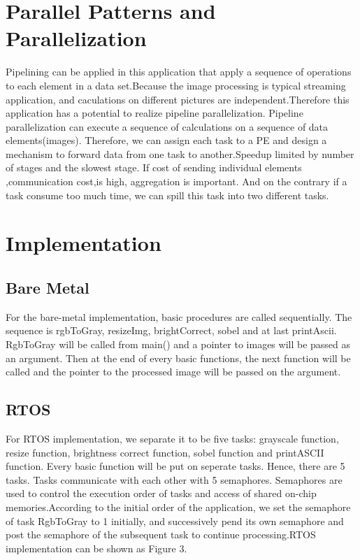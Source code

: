 \documentclass[conference,compsoc]{IEEEtran}
\begin{document}
\section{Parallel Patterns and Parallelization}
Pipelining can be applied in this application that apply a sequence of operations to
each element in a data set.Because the image processing is typical streaming application, and caculations on different pictures are independent.Therefore this application has a potential to realize pipeline parallelization. Pipeline parallelization can execute a sequence of calculations on a sequence of data elements(images). Therefore, we can assign each task to a PE and design a mechanism to forward data from one task to another.Speedup limited by number of stages and the slowest stage. If cost of sending individual elements ,communication cost,is high, aggregation is important. And on the contrary if a task consume too much time, we can spill this task into two different tasks.
 
  \section{Implementation}  
  \subsection{Bare Metal}
    For the bare-metal implementation, basic procedures are called sequentially. The sequence is rgbToGray, resizeImg, brightCorrect, sobel and at last printAscii. 
    RgbToGray will be called from main() and a pointer to images will be passed as 
    an argument. Then at the end of every basic functions, the next function will be called and the 
    pointer to the processed image will be passed on the argument.
    \subsection{RTOS}
    For RTOS implementation, we separate it to be
five tasks: grayscale function, resize function, brightness correct function, sobel function and printASCII function. Every basic function will be put on seperate tasks. Hence,
     there are 5 tasks. Tasks communicate with each other with 5 semaphores. Semaphores are used to control the execution order of tasks and access of shared on-chip memories.According to
the initial order of the application, we set the semaphore of
task RgbToGray to 1 initially, and successively pend its own
semaphore and post the semaphore of the subsequent task to
continue processing.RTOS implementation can be shown as Figure 3.
   
\end{document}
